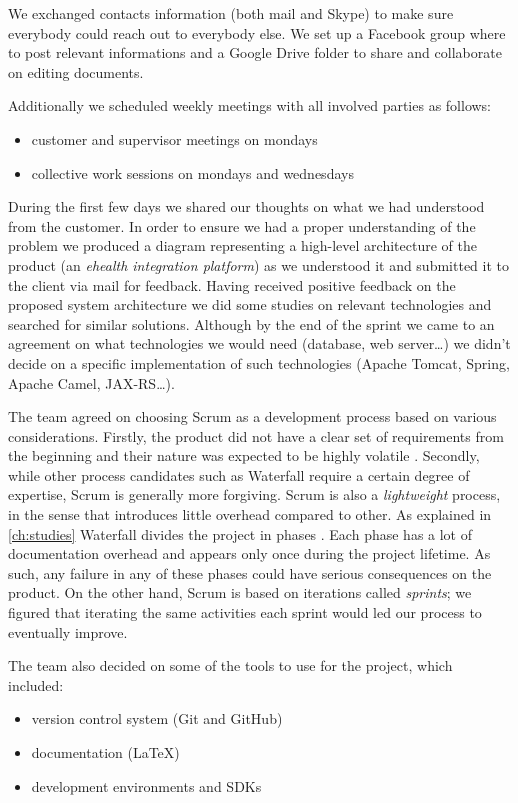 We exchanged contacts information (both mail and Skype) to make sure everybody could reach out to
everybody else. We set up a Facebook group where to post relevant informations
and a Google Drive folder to share and collaborate on editing documents.

Additionally we scheduled weekly meetings with all involved parties as follows:
\begin{itemize}
\item customer and supervisor meetings on mondays
\item collective work sessions on mondays and wednesdays
\end{itemize}

During the first few days we shared our thoughts on what we had understood from the customer.
In order to ensure we had a proper understanding of the problem we produced a diagram representing
a high-level architecture of the product (an \textit{ehealth integration platform}) as
we understood it and submitted it to the client via mail for feedback.
Having received positive feedback on the proposed system architecture we did some studies
on relevant technologies and searched for similar solutions. Although by the end of the
sprint we came to an agreement on what technologies we would need (database, web server\ldots)
we didn't decide on a specific implementation of such technologies (Apache Tomcat, Spring,
Apache Camel, JAX-RS\ldots).

The team agreed on choosing Scrum as a development process based on various considerations.
Firstly, the product did not have a clear set of requirements from the beginning and their nature was expected
to be highly volatile \cite{Sommerville9}. %
Secondly, while other process candidates such as Waterfall require a certain degree of expertise,
Scrum is generally more forgiving. Scrum is also a \textit{lightweight} process, in the sense that introduces
little overhead compared to other.
As explained in \ref{ch:studies} Waterfall divides the project in phases \cite{Sommerville9}.
Each phase has a lot of documentation overhead and appears only once during the project lifetime.
As such, any failure in any of these phases could have serious consequences on the product.
On the other hand, Scrum is based on iterations called \textit{sprints}; we figured that iterating the
same activities each sprint would led our process to eventually improve.

The team also decided on some of the tools to use for the project, which included:
\begin{itemize}
\item version control system (Git and GitHub)
\item documentation (LaTeX)
\item development environments and SDKs
\end{itemize}

